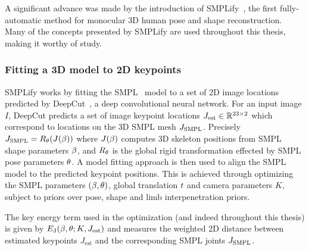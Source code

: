     A significant advance was made by the introduction of SMPLify~\cite{xxx}, the first fully-automatic method for monocular 3D human pose and shape reconstruction. Many of the concepts presented by SMPLify are used throughout this thesis, making it worthy of study. 




    \subsubsection{Fitting a 3D model to 2D keypoints}

    \def\J#1{J_\mathrm{#1}}

    SMPLify works by fitting the SMPL~\cite{loper15smpl} model to a set of 2D image locations predicted by DeepCut~\cite{xxx}, a deep convolutional neural network. For an input image $I$, DeepCut predicts a set of image keypoint locations $\J{est} \in \RR{23}{2}$ which correspond to locations on the 3D SMPL mesh $\J{\SMPL}$. Precisely $\J{\SMPL} = R_{\pose}(J(\shape))$ where $J(\beta)$ computes 3D skeleton positions from SMPL shape parameters $\beta$, and $R_{\theta}$ is the global rigid transformation effected by SMPL pose parameters $\theta$. A model fitting approach is then used to align the SMPL model to the predicted keypoint positions. This is achieved through optimizing the SMPL parameters $(\beta, \theta)$, global translation $t$ and camera parameters $K$, subject to priors over pose, shape and limb interpenetration priors. 

    The key energy term used in the optimization (and indeed throughout this thesis) is given by $\E{J}(\shape, \pose; K, \J{est})$ and measures the weighted 2D distance between estimated keypoints $\J{est}$ and the corresponding SMPL joints $J_{\operatorname{SMPL}}$.

